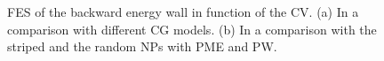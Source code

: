 \begin{figure}[pth]
\begin{adjustwidth}{-1.5cm}{-0.5cm}
		\caption{\acs{FES} of the backward energy wall in function of the \acs{CV}. (a) In a comparison with different \acs{CG} models. (b) In a comparison with the striped and the random \acp{NP} with \acs{PME} and \acs{PW}.}%
		\label{fig:backwardWall}	
	\end{adjustwidth}
\end{figure}

